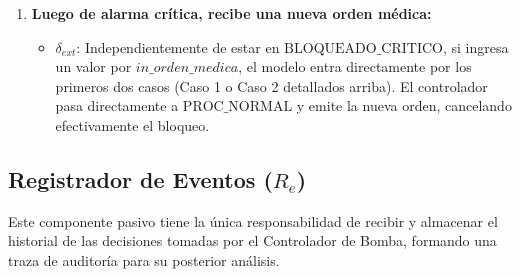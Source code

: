 \begin{itemize}
\begin{enumerate}
        \item \textbf{Luego de alarma crítica, recibe una nueva orden médica:}
        \begin{itemize}
            \item $\delta_{ext}$: Independientemente de estar en $\text{BLOQUEADO\_CRITICO}$, si ingresa un valor por $in\_orden\_medica$, el modelo entra directamente por los primeros dos casos (Caso 1 o Caso 2 detallados arriba). El controlador pasa directamente a $\text{PROC\_NORMAL}$ y emite la nueva orden, cancelando efectivamente el bloqueo.
        \end{itemize}
    \end{enumerate}

\end{itemize}

\subsection{Registrador de Eventos ($R_e$)}
Este componente pasivo tiene la única responsabilidad de recibir y almacenar el historial de las decisiones tomadas por el Controlador de Bomba, formando una traza de auditoría para su posterior análisis. 

